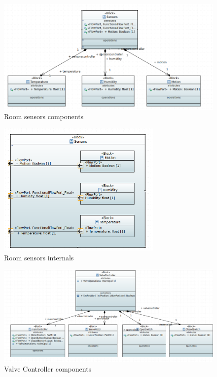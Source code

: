 \begin{figure}[H]
	\centering
	\includegraphics[width=13cm,keepaspectratio]{img/sysml/SensorsComponents}
	\caption{Room sensors components}
	\label{fig:room_sensors_components}
\end{figure}

\begin{figure}[H]
	\centering
	\includegraphics[width=8cm,keepaspectratio]{img/sysml/SensorsInternals}
	\caption{Room sensors internals}
	\label{fig:room_sensors_internals}
\end{figure}

\begin{figure}[H]
	\centering
	\includegraphics[width=12cm,keepaspectratio]{img/sysml/ValveControllerComponents}
	\caption{Valve Controller components}
	\label{fig:valve_dbd}
\end{figure}

